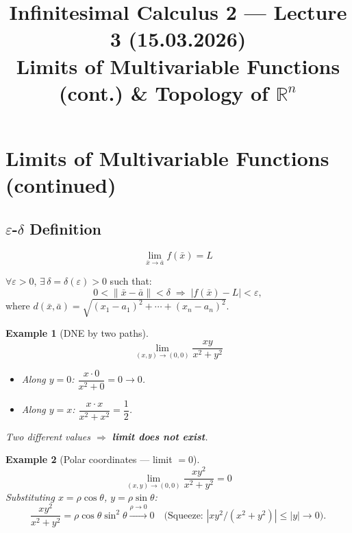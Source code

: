 \documentclass[12pt,a4paper]{article}
\title{Infinitesimal Calculus 2 --- Lecture 3 (15.03.2026)\\
\large Limits of Multivariable Functions (cont.) \& Topology of $\mathbb{R}^n$}
\date{}
\newtheorem{example}{Example}
\begin{document}
\maketitle

\section*{Limits of Multivariable Functions (continued)}

\subsection*{$\varepsilon$-$\delta$ Definition}

\[
  \lim_{\bar{x}\to\bar{a}} f(\bar{x}) = L
\]

$\forall\varepsilon>0$, $\exists\,\delta = \delta(\varepsilon)>0$ such that:
\[
  0 < \|\bar{x}-\bar{a}\| < \delta \;\Longrightarrow\; |f(\bar{x})-L| < \varepsilon,
\]
where $d(\bar{x},\bar{a}) = \sqrt{(x_1-a_1)^2+\cdots+(x_n-a_n)^2}$.

\bigskip

\begin{example}[DNE by two paths]
\[
  \lim_{(x,y)\to(0,0)} \frac{xy}{x^2+y^2}
\]

\begin{center}
\end{center}

\begin{itemize}
  \item Along $y=0$: $\dfrac{x\cdot 0}{x^2+0}=0\to 0$.
  \item Along $y=x$: $\dfrac{x\cdot x}{x^2+x^2}=\dfrac{1}{2}$.
\end{itemize}
Two different values $\Rightarrow$ \textbf{limit does not exist}.
\end{example}

\begin{example}[Polar coordinates --- limit $= 0$]
\[
  \lim_{(x,y)\to(0,0)} \frac{xy^2}{x^2+y^2} = 0
\]
Substituting $x=\rho\cos\theta$, $y=\rho\sin\theta$:
\[
  \frac{xy^2}{x^2+y^2} = \rho\cos\theta\sin^2\theta \xrightarrow{\rho\to 0} 0
  \quad \text{(Squeeze: }|xy^2/(x^2+y^2)|\le|y|\to 0\text{)}.
\]
\end{example}
\end{document}
